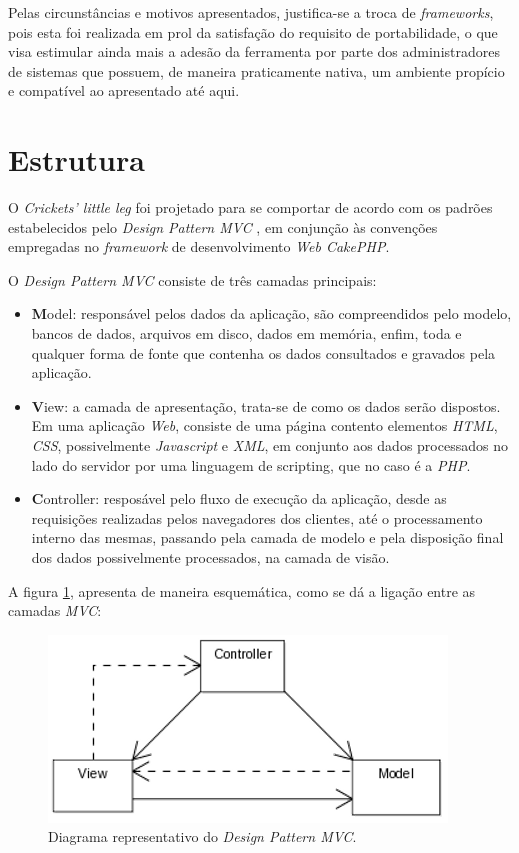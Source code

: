 Pelas circunstâncias e motivos apresentados, justifica-se a troca de \textit{frameworks}, pois esta foi realizada em prol da satisfação do requisito de portabilidade, o que visa estimular ainda mais a adesão da ferramenta por parte dos administradores de sistemas que possuem, de maneira praticamente nativa, um ambiente propício e compatível ao apresentado até aqui.

\section{Estrutura}

O \textit{Crickets' little leg} foi projetado para se comportar de acordo com os padrões estabelecidos pelo \textit{Design Pattern MVC} \cite{MVC}, em conjunção às convenções empregadas no \textit{framework} de desenvolvimento \textit{Web CakePHP}.

O \textit{Design Pattern MVC} consiste de três camadas principais:
\begin{itemize}
    \item \textbf{M}odel: responsável pelos dados da aplicação, são compreendidos pelo modelo, bancos de dados, arquivos em disco, dados em memória, enfim, toda e qualquer forma de fonte que contenha os dados consultados e gravados pela aplicação.

    \item \textbf{V}iew: a camada de apresentação, trata-se de como os dados serão dispostos. Em uma aplicação \textit{Web}, consiste de uma página contento elementos \textit{HTML}, \textit{CSS}, possivelmente \textit{Javascript} e \textit{XML}, em conjunto aos dados processados no lado do servidor por uma linguagem de scripting, que no caso é a \textit{PHP}.

    \item \textbf{C}ontroller: resposável pelo fluxo de execução da aplicação, desde as requisições realizadas pelos navegadores dos clientes, até o processamento interno das mesmas, passando pela camada de modelo e pela disposição final dos dados possivelmente processados, na camada de visão.
\end{itemize}

A figura \ref{figura:MVC}, apresenta de maneira esquemática, como se dá a ligação entre as camadas \textit{MVC}:

\clearpage
\begin{figure}[h!tp]
    \begin{center}
        \includegraphics[scale=1]{./figuras/ModelViewControllerDiagram.png}

        \caption{\label{figura:MVC}Diagrama representativo do \textit{Design Pattern MVC}.}
    \end{center}
\end{figure}


